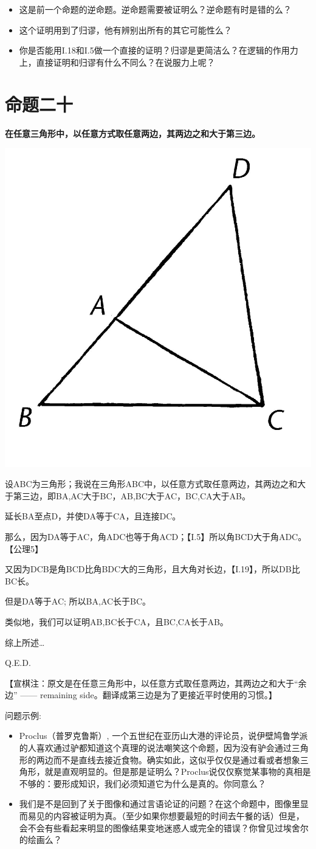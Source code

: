 \documentclass[
]{book}
\providecommand{\tightlist}{%
  \setlength{\itemsep}{0pt}\setlength{\parskip}{0pt}}
\begin{document}
\begin{itemize}
\tightlist
\item
  这是前一个命题的逆命题。逆命题需要被证明么？逆命题有时是错的么？
\item
  这个证明用到了归谬，他有辨别出所有的其它可能性么？
\item
  你是否能用I.18和I.5做一个直接的证明？归谬是更简洁么？在逻辑的作用力上，直接证明和归谬有什么不同么？在说服力上呢？
\end{itemize}

\hypertarget{ux547dux9898ux4e8cux5341}{%
\section{命题二十}\label{ux547dux9898ux4e8cux5341}}

\textbf{在任意三角形中，以任意方式取任意两边，其两边之和大于第三边。}

\includegraphics[width=0.3\linewidth]{./image/img489}

设ABC为三角形；我说在三角形ABC中，以任意方式取任意两边，其两边之和大于第三边，即BA,AC大于BC，AB,BC大于AC，BC,CA大于AB。

延长BA至点D，并使DA等于CA，且连接DC。

那么，因为DA等于AC，角ADC也等于角ACD；【I.5】所以角BCD大于角ADC。【公理5】

又因为DCB是角BCD比角BDC大的三角形，且大角对长边，【I.19】，所以DB比BC长。

但是DA等于AC; 所以BA,AC长于BC。

类似地，我们可以证明AB,BC长于CA，且BC,CA长于AB。

综上所述\ldots{}

Q.E.D.

【宣棋注：原文是在任意三角形中，以任意方式取任意两边，其两边之和大于``余边'' ------ remaining side。翻译成第三边是为了更接近平时使用的习惯。】

问题示例:

\begin{itemize}
\tightlist
\item
  Proclus（普罗克鲁斯）, 一个五世纪在亚历山大港的评论员，说伊壁鸠鲁学派的人喜欢通过驴都知道这个真理的说法嘲笑这个命题，因为没有驴会通过三角形的两边而不是直线去接近食物。确实如此，这似乎仅仅是通过看或者想象三角形，就是直观明显的。但是那是证明么？Proclus说仅仅察觉某事物的真相是不够的：要形成知识，我们必须知道它为什么是真的。你同意么？
\item
  我们是不是回到了关于图像和通过言语论证的问题？在这个命题中，图像里显而易见的内容被证明为真。（至少如果你想要最短的时间去午餐的话）但是，会不会有些看起来明显的图像结果变地迷惑人或完全的错误？你曾见过埃舍尔的绘画么？
\end{itemize}
\end{document}
